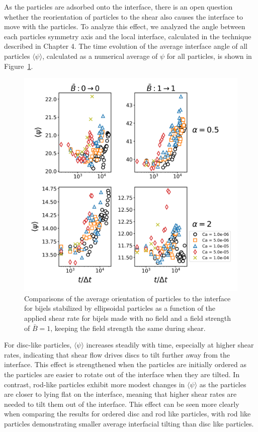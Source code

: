As the particles are adsorbed onto the interface, there is an open question whether the reorientation of particles to the shear also causes the interface to move with the
particles. To analyze this effect, we analyzed the angle between each particles symmetry axis and the local interface, calculated in the technique described in Chapter 4.
The time evolution of the average interface angle of all particles $\langle \psi \rangle$, calculated as a numerical average of $\psi$ for all particles, is shown in 
Figure~\ref{fig:interface_angle_shear}.

\begin{figure} 
    \centering 
    \includegraphics[scale=0.5]{../figures/results/paper3/psi-time_compare-specific.png} 
    \caption{Comparisons of the average orientation of particles to the interface for bijels stabilized by
             ellipsoidal particles as a function of the applied shear rate for bijels made with no field and a field strength of $\bar{B} = 1$,
             keeping the field strength the same during shear.} 
    \label{fig:interface_angle_shear} 
\end{figure}

For disc-like particles, $\langle \psi \rangle$ increases steadily with time, especially at higher shear rates, indicating that shear 
flow drives discs to tilt further away from the interface. This effect is strengthened when the particles are initially ordered as the particles are easier to rotate out of the
interface when they are tilted. In contrast, rod-like particles exhibit more modest changes in $\langle \psi \rangle$ as the particles are closer to lying flat on the interface, meaning
that higher shear rates are needed to tilt them out of the interface. This effect can be seen more clearly when comparing the results for ordered disc and rod like particles, with
rod like particles demonstrating smaller average interfacial tilting than disc like particles.  

